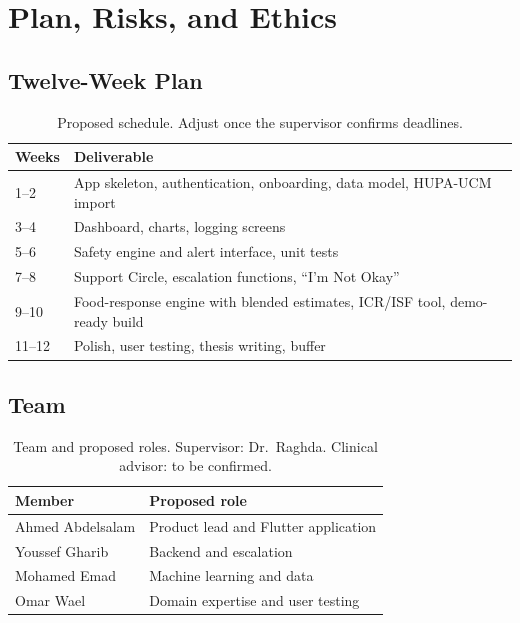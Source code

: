 \chapter{Plan, Risks, and Ethics}

\section{Twelve-Week Plan}
\begin{table}[h]
\centering
\begin{tabularx}{\textwidth}{lX}
\hline
Weeks & Deliverable \\
\hline
1--2 & App skeleton, authentication, onboarding, data model, HUPA-UCM import \\
3--4 & Dashboard, charts, logging screens \\
5--6 & Safety engine and alert interface, unit tests \\
7--8 & Support Circle, escalation functions, ``I'm Not Okay'' \\
9--10 & Food-response engine with blended estimates, ICR/ISF tool, demo-ready build \\
11--12 & Polish, user testing, thesis writing, buffer \\
\hline
\end{tabularx}
\caption{Proposed schedule. Adjust once the supervisor confirms deadlines.}
\end{table}

\section{Team}
\begin{table}[h]
\centering
\begin{tabular}{ll}
\hline
Member & Proposed role \\
\hline
Ahmed Abdelsalam & Product lead and Flutter application \\
Youssef Gharib & Backend and escalation \\
Mohamed Emad & Machine learning and data \\
Omar Wael & Domain expertise and user testing \\
\hline
\end{tabular}
\caption{Team and proposed roles. Supervisor: Dr.~Raghda. Clinical advisor: to be confirmed.}
\end{table}


